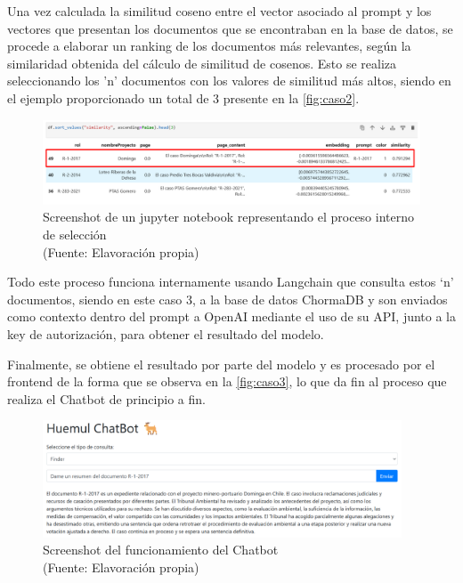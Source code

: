 Una vez calculada la similitud coseno entre el vector asociado al prompt y los vectores que presentan los documentos que se encontraban en la 
base de datos, se procede a elaborar un ranking de los documentos más relevantes, según la similaridad obtenida del cálculo de similitud de cosenos. 
Esto se realiza seleccionando los 'n' documentos con los valores de similitud más altos, siendo en el ejemplo proporcionado un total de 3 
presente en la \autoref{fig:caso2}.

\begin{figure}[ht!]
    \centering
    \includegraphics[width=1\textwidth]{figures/embedding2.png}
    \caption[Screenshot de un jupyter notebook representando el proceso interno de selección]{Screenshot de un jupyter notebook representando el proceso interno de selección\\
    {\scriptsize (Fuente: Elavoración propia)}}
    \label{fig:caso2}
\end{figure}

\newpage

Todo este proceso funciona internamente usando Langchain que consulta estos ‘n’ documentos, siendo en este caso 3, a la base de datos 
ChormaDB y son enviados como contexto dentro del prompt a OpenAI mediante el uso de su API, junto a la key de autorización, 
para obtener el resultado del modelo.

Finalmente, se obtiene el resultado por parte del modelo y es procesado por el frontend de la forma que se observa en la \autoref{fig:caso3}, 
lo que da fin al proceso que realiza el Chatbot de principio a fin.


\begin{figure}[ht!]
    \centering
    \includegraphics[width=0.95\textwidth]{figures/website2.png}
    \caption[Screenshot del funcionamiento del Chatbot]{Screenshot del funcionamiento del Chatbot\\
    {\scriptsize (Fuente: Elavoración propia)}}
    \label{fig:caso3}
\end{figure}
